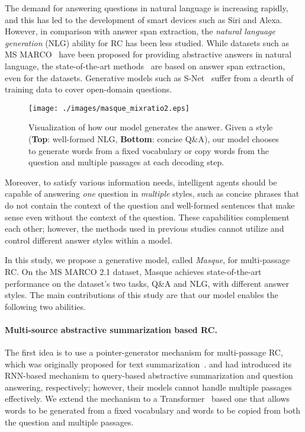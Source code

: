 \documentclass[11pt,a4paper]{article}
\theoremstyle{mydef}
\theoremstyle{myprob}
\begin{document}
The demand for answering questions in natural language is increasing rapidly, and this has led to the development of smart devices such as Siri and Alexa. However, in comparison with answer span extraction, the \textit{natural language generation} (NLG) ability for RC has been less studied. While datasets such as MS MARCO~\citep{Bajaj18} have been proposed for providing abstractive answers in natural language, the state-of-the-art methods~\citep{WuWLHWLLL18,YanAAAI19} are based on answer span extraction, even for the datasets. Generative models such as S-Net~\citep{TanWYDLZ18} suffer from a dearth of training data to cover open-domain questions.

\begin{figure}[t!]
\centering
\texttt{[image: ./images/masque\_mixratio2.eps]}
\caption{Visualization of how our model generates the answer. Given a style (\textbf{Top}: well-formed NLG, \textbf{Bottom}: concise Q\&A), our model chooses to generate words from a fixed vocabulary or copy words from the question and multiple passages at each decoding step.
}
\label{fig:mixratio}
\end{figure}
 
Moreover, to satisfy various information needs, intelligent agents should be capable of answering \textit{one} question in \textit{multiple} styles, such as concise phrases that do not contain the context of the question and well-formed sentences that make sense even without the context of the question. These capabilities complement each other; however, the methods used in previous studies cannot utilize and control different answer styles within a model.

In this study, we propose a generative model, called \textit{Masque}, for multi-passage RC. 
On the MS MARCO 2.1 dataset,
Masque achieves state-of-the-art performance on the dataset's two tasks, Q\&A and NLG, with different answer styles. 
The main contributions of this study are that our model enables the following two abilities.

\paragraph{Multi-source abstractive summarization based RC.} The first idea is to use a pointer-generator mechanism for multi-passage RC, which was originally proposed for text summarization~\citep{SeeLM17}. \citet{HasselqvistHK17} and \citet{McCannKXS18} had introduced 
its RNN-based mechanism
to query-based abstractive summarization and question answering, respectively; however, their models cannot handle multiple passages effectively. We extend the mechanism to a Transformer~\citep{VaswaniSPUJGKP17} based one that allows words to be generated from a fixed vocabulary and words to be copied from both the question and multiple passages. 
\end{document}
